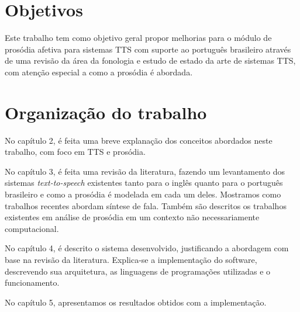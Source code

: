 \section{Objetivos}
Este trabalho tem como objetivo geral propor melhorias para o módulo de prosódia afetiva para sistemas TTS com suporte ao português brasileiro através de uma revisão da área da fonologia e estudo de estado da arte de sistemas TTS, com atenção especial a como a prosódia é abordada.

\section{Organização do trabalho}

No capítulo 2, é feita uma breve explanação dos conceitos abordados neste
trabalho, com foco em TTS e prosódia.


No capítulo 3, é feita uma revisão da literatura, fazendo um levantamento dos
sistemas \emph{text-to-speech} existentes tanto para o inglês quanto para o
português brasileiro e como a prosódia é modelada em cada um deles. Mostramos
como trabalhos recentes abordam síntese de fala. Também são descritos os
trabalhos existentes em análise de prosódia em um contexto não necessariamente
computacional.

No capítulo 4, é descrito o sistema desenvolvido, justificando a abordagem com
base na revisão da literatura. Explica-se a implementação do software,
descrevendo sua arquitetura, as linguagens de programações utilizadas e o funcionamento.

No capítulo 5,
apresentamos os resultados obtidos com a implementação.